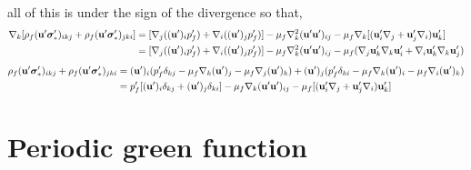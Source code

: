 all of this is under the sign of the divergence so that, 
\begin{align*}
    \mathbf{\nabla}_k [
        \rho_f (\textbf{u}' \bm\sigma_*')_{ikj}
        + \rho_f (\textbf{u}' \bm\sigma_*')_{jki}
    ]
    &=
    [\mathbf{\nabla}_j ((\textbf{u}')_i  p_f')+\mathbf{\nabla}_i ((\textbf{u}')_j p_f')]
    - \mu_f \mathbf{\nabla}_k^2 (\textbf{u}'\textbf{u}')_{ij}
    - \mu_f \mathbf{\nabla}_k [
        (\textbf{u}'_i \mathbf{\nabla}_j+ \textbf{u}'_j \mathbf{\nabla}_i )\textbf{u}'_k
    ]\\
    &=
    [\mathbf{\nabla}_j ((\textbf{u}')_i  p_f')+\mathbf{\nabla}_i ((\textbf{u}')_j p_f')]
    - \mu_f \mathbf{\nabla}_k^2 (\textbf{u}'\textbf{u}')_{ij}
    - \mu_f (\mathbf{\nabla}_j\textbf{u}'_k \mathbf{\nabla}_k \textbf{u}'_i+ \mathbf{\nabla}_i\textbf{u}'_k\mathbf{\nabla}_k \textbf{u}_j')  
    \\
\end{align*}
\begin{align*}
    \rho_f (\textbf{u}' \bm\sigma_*')_{ikj}
    + \rho_f (\textbf{u}' \bm\sigma_*')_{jki}
    &=
    (\textbf{u}')_i (
        p_f' \delta_{kj}
    - \mu_f \mathbf{\nabla}_k (\textbf{u}')_j
    - \mu_f  \mathbf{\nabla}_j (\textbf{u}')_k
    )
    + (\textbf{u}')_j (
        p_f' \delta_{ki}
    - \mu_f \mathbf{\nabla}_k (\textbf{u}')_i
    - \mu_f  \mathbf{\nabla}_i (\textbf{u}')_k
    )\\
    &= p_f'[(\textbf{u}')_i  \delta_{kj}+ (\textbf{u}')_j  \delta_{ki}]
    - \mu_f \mathbf{\nabla}_k (\textbf{u}'\textbf{u}')_{ij}
    - \mu_f [
        (\textbf{u}'_i \mathbf{\nabla}_j+ \textbf{u}'_j \mathbf{\nabla}_i )\textbf{u}'_k
    ]
    \\
\end{align*}


\section{Periodic green function}
